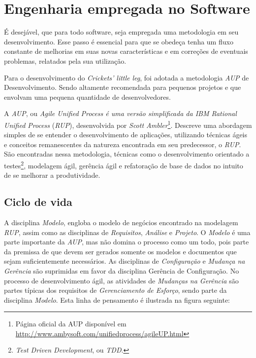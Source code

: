 \chapter{Engenharia empregada no Software}\label{3_engenharia_sw}

É desejável, que para todo software, seja empregada uma metodologia em seu desenvolvimento. Esse passo é essencial para que se obedeça tenha um fluxo constante de melhorias em suas novas características e em correções de eventuais problemas, relatados pela sua utilização.

Para o desenvolvimento do \textit{Crickets' little leg}, foi adotada a metodologia \textit{AUP} de Desenvolvimento. Sendo altamente recomendada para pequenos projetos e que envolvam uma pequena quantidade de desenvolvedores.

A \textit{AUP}, ou \textit{Agile Unified\textit{ Process} é uma versão simplificada da IBM Rational Unified Process} (\textit{RUP}), desenvolvida por \textit{Scott Ambler}\footnote{Página oficial da AUP disponível em \url{http://www.ambysoft.com/unifiedprocess/agileUP.html}}. Descreve uma abordagem simples de se entender o desenvolvimento de aplicações, utilizando técnicas ágeis e conceitos remanescentes da natureza encontrada em seu predecessor, o \textit{RUP}. São encontradas nessa metodologia, técnicas como o desenvolvimento orientado a testes\footnote{\textit{Test Driven Development}, ou \textit{TDD}.}, modelagem ágil, gerência ágil e refatoração de base de dados no intuito de se melhorar a produtividade.

\section{Ciclo de vida}

A disciplina \textit{Modelo}, engloba o modelo de negócios encontrado na modelagem \textit{RUP}, assim como as disciplinas de \textit{Requisitos}, \textit{Análise} e \textit{Projeto}. O \textit{Modelo} é uma parte importante da \textit{AUP}, mas não domina o processo como um todo, pois parte da premissa de que devem ser gerados somente os modelos e documentos que sejam suficientemente necessários. As disciplinas de \textit{Configuração} e \textit{Mudança na Gerência} são suprimidas em favor da disciplina Gerência de Configuração. No processo de desenvolvimento ágil, as atividades de \textit{Mudanças na Gerência} são partes típicas dos requisitos de \textit{Gerenciamento de Esforço}, sendo parte da disciplina \textit{Modelo}. Esta linha de pensamento é ilustrada na figura seguinte:

